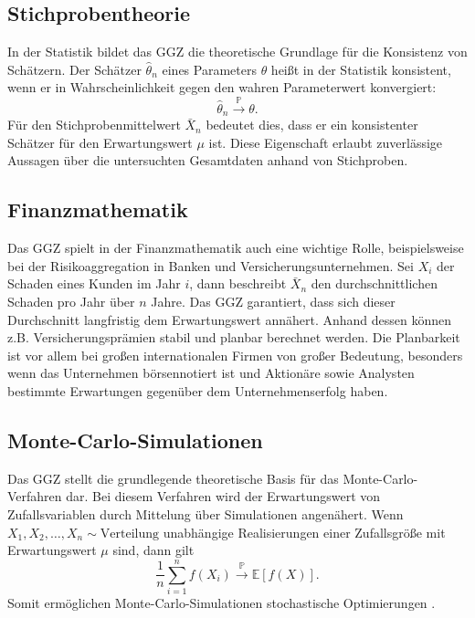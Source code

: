 \documentclass[12pt,a4paper]{article}
\begin{document}
\subsection{Stichprobentheorie}


In der Statistik bildet das GGZ die theoretische Grundlage für die Konsistenz von Schätzern. Der Schätzer \( \hat{\theta}_n \) eines Parameters \( \theta \) heißt in der Statistik konsistent, wenn er in Wahrscheinlichkeit gegen den wahren Parameterwert konvergiert:
\[
\hat{\theta}_n \xrightarrow{\mathbb{P}} \theta.
\]
Für den Stichprobenmittelwert \( \bar{X}_n \) bedeutet dies, dass er ein konsistenter Schätzer für den Erwartungswert \( \mu \) ist. Diese Eigenschaft erlaubt zuverlässige Aussagen über die untersuchten Gesamtdaten anhand von Stichproben.


\subsection{Finanzmathematik}


Das GGZ spielt in der Finanzmathematik auch eine wichtige Rolle, beispielsweise bei der Risikoaggregation in Banken und Versicherungsunternehmen. Sei \( X_i \) der Schaden eines Kunden im Jahr \( i \), dann beschreibt \( \bar{X}_n \) den durchschnittlichen Schaden pro Jahr über \( n \) Jahre. Das GGZ garantiert, dass sich dieser Durchschnitt langfristig dem Erwartungswert annähert. Anhand dessen können z.B. Versicherungsprämien stabil und planbar berechnet werden. Die Planbarkeit ist vor allem bei großen internationalen Firmen von großer Bedeutung, besonders wenn das Unternehmen börsennotiert ist und Aktionäre sowie Analysten bestimmte Erwartungen gegenüber dem Unternehmenserfolg haben.


\subsection{Monte-Carlo-Simulationen}

Das GGZ stellt die grundlegende theoretische Basis für das Monte-Carlo-Verfahren dar.
Bei diesem Verfahren wird der Erwartungswert von Zufallsvariablen durch Mittelung über Simulationen angenähert.
Wenn \( X_1, X_2, \dots, X_n \sim \text{Verteilung} \) unabhängige Realisierungen einer Zufallsgröße mit Erwartungswert \( \mu \) sind, dann gilt
\[
\frac{1}{n} \sum_{i=1}^n f(X_i) \xrightarrow{\mathbb{P}} \mathbb{E}[f(X)].
\]
Somit ermöglichen Monte-Carlo-Simulationen stochastische Optimierungen  \citep{degroot2021}.
\end{document}
